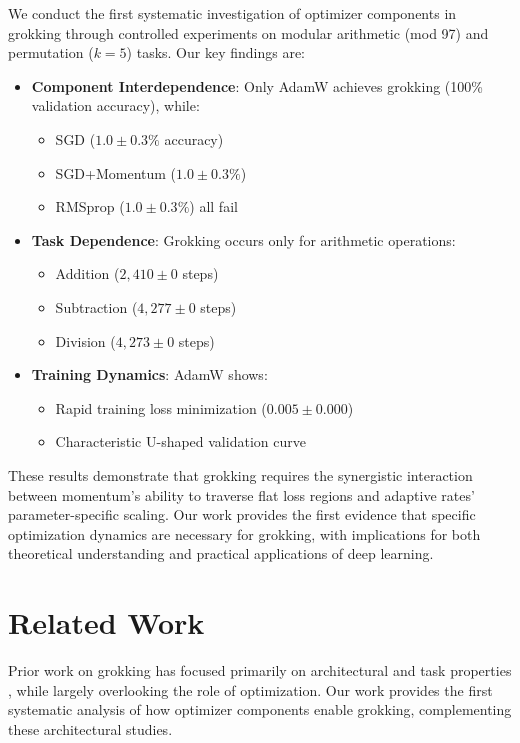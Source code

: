 \documentclass{article} %
\begin{document}
We conduct the first systematic investigation of optimizer components in grokking through controlled experiments on modular arithmetic (mod 97) and permutation ($k=5$) tasks. Our key findings are:

\begin{itemize}
    \item \textbf{Component Interdependence}: Only AdamW achieves grokking (100\% validation accuracy), while:
    \begin{itemize}
        \item SGD ($1.0\pm0.3\%$ accuracy)
        \item SGD+Momentum ($1.0\pm0.3\%$)
        \item RMSprop ($1.0\pm0.3\%$) all fail
    \end{itemize}
    \item \textbf{Task Dependence}: Grokking occurs only for arithmetic operations:
    \begin{itemize}
        \item Addition ($2,\!410\pm0$ steps)
        \item Subtraction ($4,\!277\pm0$ steps)
        \item Division ($4,\!273\pm0$ steps)
    \end{itemize}
    \item \textbf{Training Dynamics}: AdamW shows:
    \begin{itemize}
        \item Rapid training loss minimization ($0.005\pm0.000$)
        \item Characteristic U-shaped validation curve
    \end{itemize}
\end{itemize}

These results demonstrate that grokking requires the synergistic interaction between momentum's ability to traverse flat loss regions and adaptive rates' parameter-specific scaling. Our work provides the first evidence that specific optimization dynamics are necessary for grokking, with implications for both theoretical understanding and practical applications of deep learning.

\section{Related Work}
\label{sec:related}

Prior work on grokking has focused primarily on architectural and task properties \citep{power2022grokking}, while largely overlooking the role of optimization. Our work provides the first systematic analysis of how optimizer components enable grokking, complementing these architectural studies.
\end{document}
